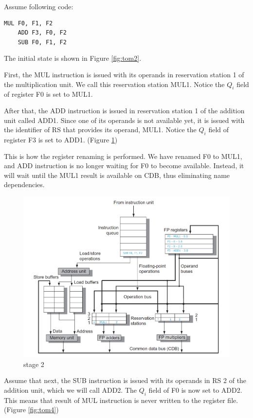 \documentclass[12pt]{article}
\begin{document}
Assume following code:

\begin{lstlisting}[style=CStyle]
	MUL F0, F1, F2
	ADD F3, F0, F2
	SUB F0, F1, F2
\end{lstlisting}


The initial state is shown in Figure \ref{fig:tom2}.

First, the MUL instruction is issued with its operands in reservation station 1 of the multiplication unit. We call this reservation station MUL1. Notice the $Q_i$ field of register F0 is set to MUL1.

After that, the ADD instruction is issued in reservation station 1 of the addition unit called ADD1. Since one of its operands is not available yet, it is issued with the identifier of RS that provides its operand, MUL1. Notice the $Q_i$ field of register F3 is set to ADD1. (Figure \ref{fig:tom3})

This is how the register renaming is performed. We have renamed F0 to MUL1, and ADD instruction is no longer waiting for F0 to become available. Instead, it will wait until the MUL1 result is available on CDB, thus eliminating name dependencies. 

\begin{figure}[H]
	\centering
	\includegraphics[width=1\textwidth]{./images/tomas/e2.png}	
	\cprotect\caption{stage 2}
	\label{fig:tom3}
\end{figure}


Assume that next, the SUB instruction is issued with its operands in RS 2 of the addition unit, which we will call ADD2. The $Q_i$ field of F0 is now set to ADD2. This means that result of MUL instruction is never written to the register file. (Figure \ref{fig:tom4})
\end{document}
